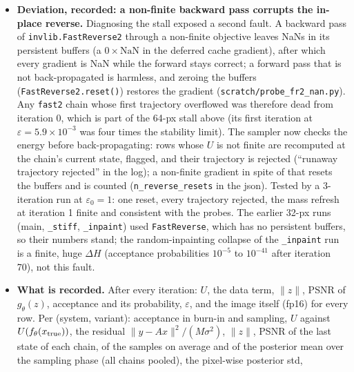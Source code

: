 \documentclass[11pt]{article}
\begin{document}
\begin{itemize}
{        --iterations 52 --burn-in 20 --mass-refresh 6,14}, all recorded
        in its json); the last refresh leaves six adaptation iterations
        to re-tune the step to the new mass.
  \item \textbf{Deviation, recorded: a non-finite backward pass corrupts
        the in-place reverse.} Diagnosing the stall exposed a second
        fault. A backward pass of \texttt{invlib.FastReverse2} through a
        non-finite objective leaves NaNs in its persistent buffers (a $0
        \times \mathrm{NaN}$ in the deferred cache gradient), after which
        every gradient is NaN while the forward stays correct; a forward
        pass that is not back-propagated is harmless, and zeroing the
        buffers (\texttt{FastReverse2.reset()}) restores the gradient
        (\texttt{scratch/probe\_fr2\_nan.py}). Any \texttt{fast2} chain
        whose first trajectory overflowed was therefore dead from
        iteration 0, which is part of the 64-px stall above (its first
        iteration at $\varepsilon = 5.9 \times 10^{-3}$ was four times
        the stability limit). The sampler now checks the energy before
        back-propagating: rows whose $U$ is not finite are recomputed at
        the chain's current state, flagged, and their trajectory is
        rejected (``runaway trajectory rejected'' in the log); a
        non-finite gradient in spite of that resets the buffers and is
        counted (\texttt{n\_reverse\_resets} in the json). Tested by a
        3-iteration run at $\varepsilon_0 = 1$: one reset, every
        trajectory rejected, the mass refresh at iteration 1 finite and
        consistent with the probes. The earlier 32-px runs (main,
        \texttt{\_stiff}, \texttt{\_inpaint}) used \texttt{FastReverse},
        which has no persistent buffers, so their numbers stand; the
        random-inpainting collapse of the \texttt{\_inpaint} run is a
        finite, huge $\Delta H$ (acceptance probabilities $10^{-5}$ to
        $10^{-41}$ after iteration 70), not this fault.
  \item \textbf{What is recorded.} After every iteration: $U$, the data
        term, $\|z\|$, PSNR of $g_\theta(z)$, acceptance and its
        probability, $\varepsilon$, and the image itself (fp16) for every
        row. Per (system, variant): acceptance in burn-in and sampling,
        $U$ against $U(f_\theta(x_{\rm true}))$, the residual
        $\|y - Ax\|^2/(M\sigma^2)$, $\|z\|$, PSNR of the last state of each
        chain, of the samples on average and of the posterior mean over the
        sampling phase (all chains pooled), the pixel-wise posterior std,

\end{itemize}
\end{document}
